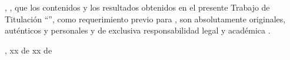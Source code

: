
\UTIAutoresPronombre, \UTIAutoresTexto, \UTIVerboDeclaro{} que los contenidos y los resultados obtenidos en el presente Trabajo de Titulación ``\UTITituloProyecto'', como requerimiento previo para \UTIFraseObtencionTituloProfesional{}, son absolutamente originales, auténticos y personales y de exclusiva responsabilidad legal y académica \UTIAutoresResponsabilidad.

\vspace{1.5cm}

\UTICiudadPais, xx de xx de \UTIAnio

\vspace{2.5cm}

\UTIFirmasAutoresBloque